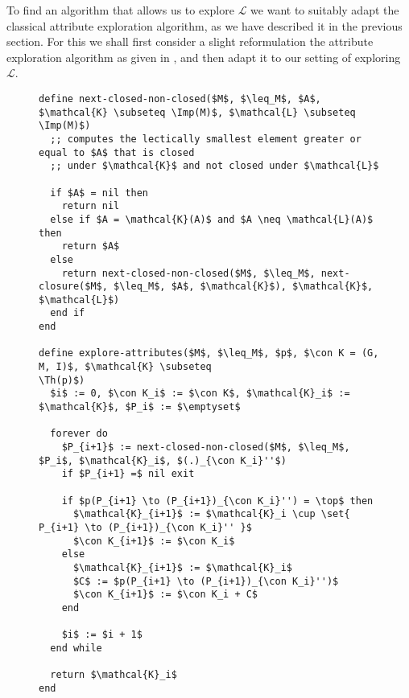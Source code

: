 To find an algorithm that allows us to explore $\mathcal{L}$ we want to suitably adapt the
classical attribute exploration algorithm, as we have described it in the previous
section.  For this we shall first consider a slight reformulation the attribute
exploration algorithm as given in , and then adapt it to
our setting of exploring $\mathcal{L}$.


\begin{figure}[tp]
  \begin{Algorithm}
  \label{alg:explore-attributes-with-next-closed-none-closed}
  \hspace*{0cm}
\begin{lstlisting}
define next-closed-non-closed($M$, $\leq_M$, $A$, $\mathcal{K} \subseteq \Imp(M)$, $\mathcal{L} \subseteq \Imp(M)$)
  ;; computes the lectically smallest element greater or equal to $A$ that is closed
  ;; under $\mathcal{K}$ and not closed under $\mathcal{L}$

  if $A$ = nil then
    return nil
  else if $A = \mathcal{K}(A)$ and $A \neq \mathcal{L}(A)$ then
    return $A$
  else
    return next-closed-non-closed($M$, $\leq_M$, next-closure($M$, $\leq_M$, $A$, $\mathcal{K}$), $\mathcal{K}$, $\mathcal{L}$)
  end if
end

define explore-attributes($M$, $\leq_M$, $p$, $\con K = (G, M, I)$, $\mathcal{K} \subseteq
\Th(p)$)
  $i$ := 0, $\con K_i$ := $\con K$, $\mathcal{K}_i$ := $\mathcal{K}$, $P_i$ := $\emptyset$

  forever do
    $P_{i+1}$ := next-closed-non-closed($M$, $\leq_M$, $P_i$, $\mathcal{K}_i$, $(.)_{\con K_i}''$)
    if $P_{i+1} =$ nil exit

    if $p(P_{i+1} \to (P_{i+1})_{\con K_i}'') = \top$ then
      $\mathcal{K}_{i+1}$ := $\mathcal{K}_i \cup \set{ P_{i+1} \to (P_{i+1})_{\con K_i}'' }$
      $\con K_{i+1}$ := $\con K_i$
    else
      $\mathcal{K}_{i+1}$ := $\mathcal{K}_i$
      $C$ := $p(P_{i+1} \to (P_{i+1})_{\con K_i}'')$
      $\con K_{i+1}$ := $\con K_i + C$
    end

    $i$ := $i + 1$
  end while

  return $\mathcal{K}_i$  
end
\end{lstlisting}
  \end{Algorithm}
\end{figure}

